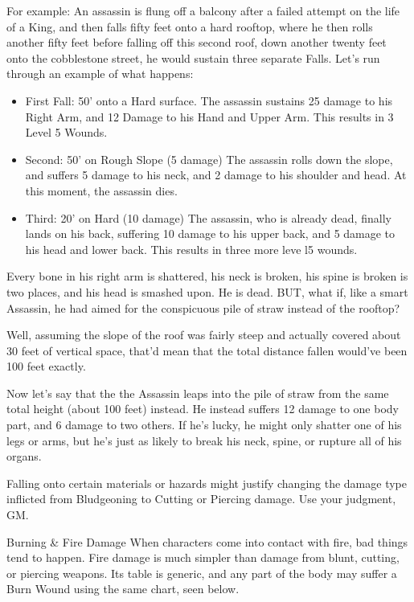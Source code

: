 \documentclass[oneside,11pt,english]{book}
\begin{document}
 

For example: An assassin is flung off a balcony after a failed attempt on the life of a King, and then falls 
fifty feet onto a hard rooftop, where he then rolls another fifty feet before falling off this second roof, 
down another twenty feet onto the cobblestone street, he would sustain three separate Falls. Let’s run 
through an example of what happens: 
\begin{itemize}
\item First Fall: 50’ onto a Hard surface. The assassin sustains 25 damage to his Right Arm, and 12 
Damage to his Hand and Upper Arm. This results in 3 Level 5 Wounds. 
\item Second: 50’ on Rough Slope (5 damage) The assassin rolls down the slope, and suffers 5 damage 
to his neck, and 2 damage to his shoulder and head. At this moment, the assassin dies. 
\item Third: 20’ on Hard (10 damage) The assassin, who is already dead, finally lands on his back, 
suffering 10 damage to his upper back, and 5 damage to his head and lower back. This results in 
three more leve l5 wounds. 
\end{itemize}
 

Every bone in his right arm is shattered, his neck is broken, his spine is broken is two places, and his head 
is smashed upon. He is dead. BUT, what if, like a smart Assassin, he had aimed for the conspicuous pile 
of straw instead of the rooftop? 

 

Well, assuming the slope of the roof was fairly steep and actually covered about 30 feet of vertical space, 
that’d mean that the total distance fallen would’ve been 100 feet exactly. 

 

Now let’s say that the the Assassin leaps into the pile of straw from the same total height (about 100 feet) 
instead. He instead suffers 12 damage to one body part, and 6 damage to two others. If he’s lucky, he 
might only shatter one of his legs or arms, but he’s just as likely to break his neck, spine, or rupture all of 
his organs. 

 

Falling onto certain materials or hazards might justify changing the damage type inflicted from 
Bludgeoning to Cutting or Piercing damage. Use your judgment, GM. 

 

Burning \& Fire Damage 
When characters come into contact with fire, bad things tend to happen. Fire damage is much simpler 
than damage from blunt, cutting, or piercing weapons. Its table is generic, and any part of the body may 
suffer a Burn Wound using the same chart, seen below. 
\end{document}
